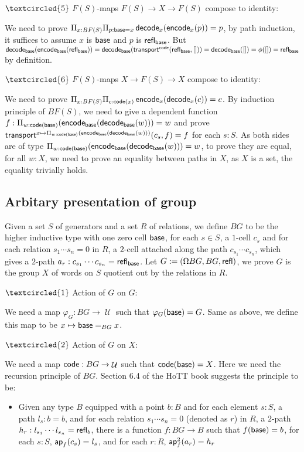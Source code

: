 \documentclass[11pt]{article}
\DeclareMathOperator{\cu}{\mathcal U}
\DeclareMathOperator{\base}{\sf base}
\DeclareMathOperator{\ap}{\sf ap}
\DeclareMathOperator{\code}{\sf code}
\DeclareMathOperator{\encode}{\sf encode}
\DeclareMathOperator{\decode}{\sf decode}
\DeclareMathOperator{\transport}{\sf transport}
\DeclareMathOperator{\rfl}{\sf refl}
\theoremstyle{definition}
\begin{document}
$\textcircled{5}$ $F(S)$-maps $F(S)\to X\to F(S)$ compose to identity:

We need to prove $\Pi_{x:BF(S)}\Pi_{p:\base = x}\decode_x(\encode_x(p))=p$, by path induction, it suffices to assume $x$ is $\base$ and $p$ is $\rfl_{\base}$. But $\decode_{\base}(\encode_{\base}(\rfl_{\base}))=\decode_{\base}(\transport^{\code}(\rfl_{\base},[]))=\decode_{\base}([])=\phi([])=\rfl_{\base}$ by definition.


$\textcircled{6}$ $F(S)$-maps $X\to F(S)\to X$ compose to identity:

We need to prove $\Pi_{x:BF(S)}\Pi_{c:\code(x)}\encode_x(\decode_x(c))=c$. By induction principle of $BF(S)$, we need to give a dependent function $f:\Pi_{w:\code(\base)}(\encode_{\base}(\decode_{\base}(w)))=w$ and prove $\transport^{x\mapsto \Pi_{w:\code(\base)}(\encode_{\base}(\decode_{\base}(w)))}(c_s,f)=f$ for each $s:S$. As both sides are of type \newline$\Pi_{w:\code(\base)}(\encode_{\base}(\decode_{\base}(w)))=w$, to prove they are equal, for all $w:X$, we need to prove an equality between paths in $X$, as $X$ is a set, the equality trivially holds.

\subsection{Arbitary presentation of group}

Given a set $S$ of generators and a set $R$ of relations, we define $BG$ to be the higher inductive type with one zero cell $\base$, for each $s\in S$, a $1$-cell $c_s$ and for each relation $s_1\cdots s_n=0$ in $R$, a $2$-cell attached along the path $c_{s_1}\cdots c_{s_n}$, which gives a $2$-path $a_r:c_{s_1}\cdots c_{s_n}=\rfl_{\base}$. Let $G:= (\Omega BG,BG,\rfl)$, we prove $G$ is the group $X$ of words on $S$ quotient out by the relations in $R$.

$\textcircled{1}$ Action of $G$ on $G$:

We need a map $\varphi_G:BG\to \cu$ such that $\varphi_G(\base) = G$. Same as above, we define this map to be $x\mapsto \base =_{BG} x$.

$\textcircled{2}$ Action of $G$ on $X$:

We need a map $\code : BG\to \cu$ such that $\code (\base) = X$. Here we need the recursion principle of $BG$. Section 6.4 of the HoTT book suggests the principle to be:
\begin{itemize}
\item Given any type $B$ equipped with a point $b: B$ and for each element $s:S$, a path $l_s:b=b$, and for each relation $s_1\cdots s_n=0$ (denoted as $r$) in $R$, a $2$-path $h_r:l_{s_1}\cdots l_{s_n}=\rfl_{b}$, there is a function $f: BG\to B$ such that $f(\base)= b$, for each $s:S$, $\ap_f(c_s)=l_s$, and for each $r:R$, $\ap^2_f(a_r)=h_r$
\end{itemize}
\end{document}
